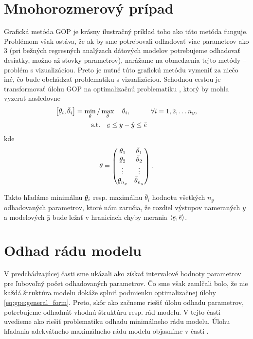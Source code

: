\section{Mnohorozmerový prípad}
Grafická metóda GOP je krásny ilustračný príklad toho ako táto metóda funguje. Problémom však ostáva, že ak by sme potrebovali odhadovať viac parametrov ako 3 (pri bežných regresných analýzach dátových modelov potrebujeme odhadovať desiatky, možno až stovky parametrov), narážame na obmedzenia tejto metódy -- problém s vizualizáciou. Preto je nutné túto grafickú metódu vymeniť za niečo iné, čo bude obchádzať problematiku s vizualizáciou. Schodnou cestou je transformovať úlohu GOP na optimalizačnú problematiku \cite{artzova:gpe_moving_hor:2019}, ktorý by mohla vyzerať nasledovne 
\begin{equation}
	\begin{split}
		\left[ \ubar{\theta}_i, \bar{\theta}_i \right] = \min_{\theta} / &\max_{\theta} \quad \theta_i, \quad\qquad \forall i = 1,2, \dots n_y, \\
		\text{s.t.}& \quad \ubar{e} \leq y - \hat{y} \leq \bar{e}	
	\end{split}
	\label{eq:gpe:general_form}
\end{equation} 
kde 
\begin{equation*}
	\theta = 
	\begin{pmatrix}
		\ubar{\theta}_1 & \bar{\theta}_1 \\
		\ubar{\theta}_2 & \bar{\theta}_2 \\
		\vdots & \vdots \\
		\ubar{\theta}_{n_y} & \bar{\theta}_{n_y}	
	\end{pmatrix}.
\end{equation*}

Takto hľadáme minimálnu $ \ubar{\theta}_i $ resp. maximálnu $ \bar{\theta}_i $ hodnotu všetkých $ n_y $ odhadovaných  parametrov, ktoré nám zaručia, že rozdiel výstupov nameraných $ y $ a modelových $ \hat{y} $ bude ležať v hraniciach chyby merania $ \langle \ubar{e}, \bar{e} \rangle $.

\section{Odhad rádu modelu}
V predchádzajúcej časti sme ukázali ako získať intervalové hodnoty parametrov pre ľubovoľný počet odhadovaných parametrov. Čo sme však zamlčali bolo, že nie každá štruktúra modelu dokáže splniť podmienku optimalizačnej úlohy \ref{eq:gpe:general_form}. Preto, skôr ako začneme riešiť úlohu odhadu parametrov, potrebujeme odhadnúť vhodnú štruktúru resp. rád modelu. V tejto časti uvedieme ako riešiť problematiku odhadu minimálneho rádu modelu. Úlohu hľadania adekvátneho maximálneho rádu modelu objasníme v časti .

